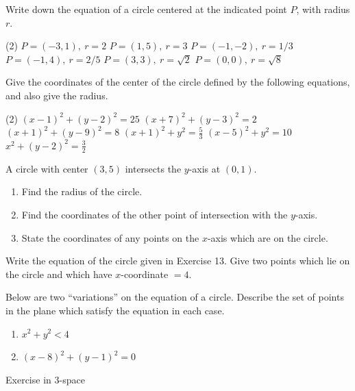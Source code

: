 \documentclass[12pt]{book} %
\begin{document}
\setcounter{Exercise}{0}
\begin{ExerciseList}
\Exercise Write down the equation of a circle centered at the indicated point $P$, with radius $r$.
\begin{tasks}(2)
\task[(1)] $P=(-3,1),\ r=2$
\task[(2)] $P=(1,5),\ r=3$
\task[(3)] $P=(-1,-2),\ r=1/3$
\task[(4)] $P=(-1,4),\ r=2/5$
\task[(5)] $P=(3,3),\ r=\sqrt{2}$
\task[(6)] $P=(0,0),\ r=\sqrt{8}$
\end{tasks}
\end{ExerciseList}

\setcounter{Exercise}{6}
\begin{ExerciseList}
\Exercise Give the coordinates of the center of the circle defined by the following equations, and also give the radius.
\begin{tasks}(2)
\task[(7)] $(x-1)^2+(y-2)^2=25$
\task[(8)] $(x+7)^2+(y-3)^2=2$
\task[(9)] $(x+1)^2+(y-9)^2=8$
\task[(10)] $(x+1)^2+y^2=\frac53$
\task[(11)] $(x-5)^2+y^2=10$
\task[(12)] $x^2+(y-2)^2=\frac32$
\end{tasks}

\Exercise A circle with center $(3,5)$ intersects the $y$-axis at $(0,1)$.
\begin{enumerate}
\item[(a)] Find the radius of the circle.
\item[(b)] Find the coordinates of the other point of intersection with the $y$-axis.
\item[(c)] State the coordinates of any points on the $x$-axis which are on the circle.
\end{enumerate}

\Exercise Write the equation of the circle given in Exercise 13. Give two points which lie on the circle and which have $x$-coordinate $=4$.

\Exercise Below are two ``variations'' on the equation of a circle. Describe the set of points in the plane which satisfy the equation in each case.
\begin{enumerate}
\item[(a)] $x^2+y^2<4$
\item[(b)] $(x-8)^2+(y-1)^2=0$
\end{enumerate}

\Exercise Exercise in 3-space


\end{ExerciseList}
\end{document}
